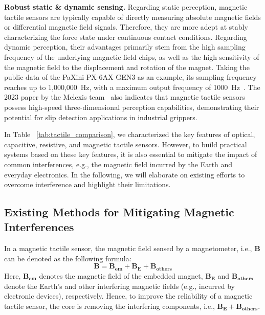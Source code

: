 \noindent\textbf{Robust static \& dynamic sensing.} 
Regarding static perception, magnetic tactile sensors are typically capable of directly measuring absolute magnetic fields or differential magnetic field signals. Therefore, they are more adept at stably characterizing the force state under continuous contact conditions. Regarding dynamic perception, their advantages primarily stem from the high sampling frequency of the underlying magnetic field chips, as well as the high sensitivity of the magnetic field to the displacement and rotation of the magnet. Taking the public data of the PaXini PX-6AX GEN3 as an example, its sampling frequency reaches up to 1,000,000~Hz, with a maximum output frequency of 1000~Hz~\cite{paxini2026itpu}. The 2023 paper by the Melexis team~\cite{LeSignor2023MassManufacturable} also indicates that magnetic tactile sensors possess high-speed three-dimensional perception capabilities, demonstrating their potential for slip detection applications in industrial grippers.

In Table ~\ref{tab:tactile_comparison}, we characterized the key features of optical, capacitive, resistive, and magnetic tactile sensors. 
However, to build practical systems based on these key features, it is also essential to mitigate the impact of common interferences, e.g., the magnetic field incurred by the Earth and everyday electronics.
In the following, we will elaborate on existing efforts to overcome interference and highlight their limitations. 

\subsection{Existing Methods for Mitigating Magnetic Interferences}
\label{sec:background2.3}
In a magnetic tactile sensor, the magnetic field sensed by a magnetometer, i.e., $\mathbf{B}$ can be denoted as the following formula:
\begin{equation}
\mathbf{B} = \mathbf{B_{em}} + \mathbf{B_{E}} + \mathbf{B_{others}}
\label{eq:denoise}
\end{equation}
Here, $\mathbf{B_{em}}$ denotes the magnetic field of the embedded magnet, $\mathbf{B_{E}}$ and $\mathbf{B_{others}}$ denote the Earth's and other interfering magnetic fields (e.g., incurred by electronic devices), respectively.
Hence, to improve the reliability of a magnetic tactile sensor, the core is removing the interfering components, i.e., $\mathbf{B_{E}} + \mathbf{B_{others}}$.

